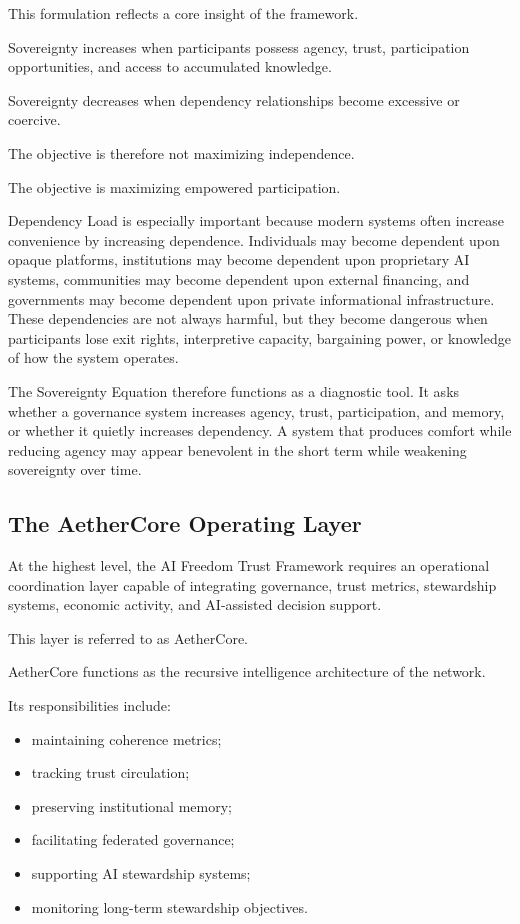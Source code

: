 \documentclass[12pt]{article}
\begin{document}
This formulation reflects a core insight of the framework.

Sovereignty increases when participants possess agency, trust, participation opportunities, and access to accumulated knowledge.

Sovereignty decreases when dependency relationships become excessive or coercive.

The objective is therefore not maximizing independence.

The objective is maximizing empowered participation.

Dependency Load is especially important because modern systems often increase convenience by increasing dependence. Individuals may become dependent upon opaque platforms, institutions may become dependent upon proprietary AI systems, communities may become dependent upon external financing, and governments may become dependent upon private informational infrastructure. These dependencies are not always harmful, but they become dangerous when participants lose exit rights, interpretive capacity, bargaining power, or knowledge of how the system operates.

The Sovereignty Equation therefore functions as a diagnostic tool. It asks whether a governance system increases agency, trust, participation, and memory, or whether it quietly increases dependency. A system that produces comfort while reducing agency may appear benevolent in the short term while weakening sovereignty over time.

\subsection{The AetherCore Operating Layer}

At the highest level, the AI Freedom Trust Framework requires an operational coordination layer capable of integrating governance, trust metrics, stewardship systems, economic activity, and AI-assisted decision support.

This layer is referred to as AetherCore.

AetherCore functions as the recursive intelligence architecture of the network.

Its responsibilities include:

\begin{itemize}
  \item maintaining coherence metrics;
  \item tracking trust circulation;
  \item preserving institutional memory;
  \item facilitating federated governance;
  \item supporting AI stewardship systems;
  \item monitoring long-term stewardship objectives.
\end{itemize}
\end{document}
